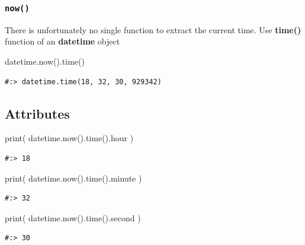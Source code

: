 \documentclass[
]{book}
\newenvironment{Shaded}{\begin{snugshade}}{\end{snugshade}}
\newcommand{\BuiltInTok}[1]{#1}
\newcommand{\NormalTok}[1]{#1}
\begin{document}
\hypertarget{now}{%
\subsubsection{\texorpdfstring{\texttt{now()}}{now()}}\label{now}}

There is unfortunately no single function to extract the current time. Use \textbf{time()} function of an \textbf{datetime} object

\begin{Shaded}
\begin{Highlighting}[]
\NormalTok{datetime.now().time()}
\end{Highlighting}
\end{Shaded}

\begin{verbatim}
#:> datetime.time(18, 32, 30, 929342)
\end{verbatim}

\hypertarget{attributes-2}{%
\subsection{Attributes}\label{attributes-2}}

\begin{Shaded}
\begin{Highlighting}[]
\BuiltInTok{print}\NormalTok{( datetime.now().time().hour )}
\end{Highlighting}
\end{Shaded}

\begin{verbatim}
#:> 18
\end{verbatim}

\begin{Shaded}
\begin{Highlighting}[]
\BuiltInTok{print}\NormalTok{( datetime.now().time().minute )}
\end{Highlighting}
\end{Shaded}

\begin{verbatim}
#:> 32
\end{verbatim}

\begin{Shaded}
\begin{Highlighting}[]
\BuiltInTok{print}\NormalTok{( datetime.now().time().second )}
\end{Highlighting}
\end{Shaded}

\begin{verbatim}
#:> 30
\end{verbatim}
\end{document}
